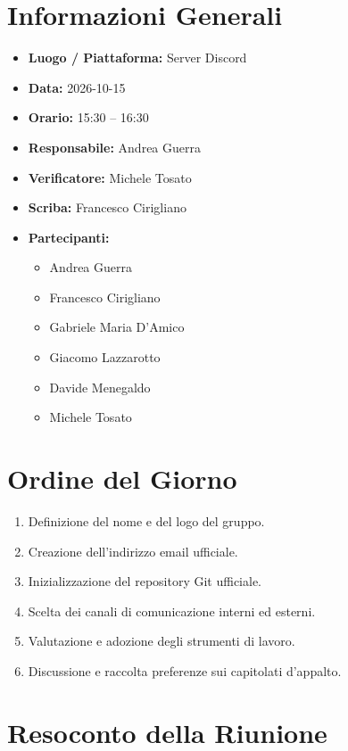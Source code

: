 \documentclass[11pt, a4paper]{article}
\newcommand{\DocDate}{2026-10-15}
\begin{document}
\section{Informazioni Generali}
\begin{itemize}
    \item \textbf{Luogo / Piattaforma:} Server Discord
    \item \textbf{Data:} \DocDate
    \item \textbf{Orario:} 15:30 -- 16:30
    \item \textbf{Responsabile:} Andrea Guerra
    \item \textbf{Verificatore:} Michele Tosato
    \item \textbf{Scriba:} Francesco Cirigliano
    \item \textbf{Partecipanti:}
        \begin{itemize}
            \item Andrea Guerra
            \item Francesco Cirigliano
            \item Gabriele Maria D'Amico
            \item Giacomo Lazzarotto
            \item Davide Menegaldo
            \item Michele Tosato
        \end{itemize}
\end{itemize}
\clearpage
\section{Ordine del Giorno}
\begin{enumerate}
    \item Definizione del nome e del logo del gruppo.
    \item Creazione dell'indirizzo email ufficiale.
    \item Inizializzazione del repository Git ufficiale.
    \item Scelta dei canali di comunicazione interni ed esterni.
    \item Valutazione e adozione degli strumenti di lavoro.
    \item Discussione e raccolta preferenze sui capitolati d'appalto.
\end{enumerate}

\section{Resoconto della Riunione}
\end{document}
